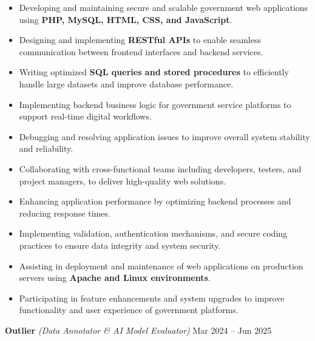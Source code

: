 \documentclass[a4paper,10.9pt]{article}
\begin{document}
\begin{itemize}

\item Developing and maintaining secure and scalable government web applications using \textbf{PHP, MySQL, HTML, CSS, and JavaScript}.

\item Designing and implementing \textbf{RESTful APIs} to enable seamless communication between frontend interfaces and backend services.

\item Writing optimized \textbf{SQL queries and stored procedures} to efficiently handle large datasets and improve database performance.

\item Implementing backend business logic for government service platforms to support real-time digital workflows.

\item Debugging and resolving application issues to improve overall system stability and reliability.

\item Collaborating with cross-functional teams including developers, testers, and project managers, to deliver high-quality web solutions.

\item Enhancing application performance by optimizing backend processes and reducing response times.

\item Implementing validation, authentication mechanisms, and secure coding practices to ensure data integrity and system security.

\item Assisting in deployment and maintenance of web applications on production servers using \textbf{Apache and Linux environments}.

\item Participating in feature enhancements and system upgrades to improve functionality and user experience of government platforms.

\end{itemize}

\vspace{3pt}

{\large\textbf{\color{hdrblue}Outlier}}
\textit{(Data Annotator \& AI Model Evaluator)} \hfill Mar 2024 -- Jun 2025
\end{document}
